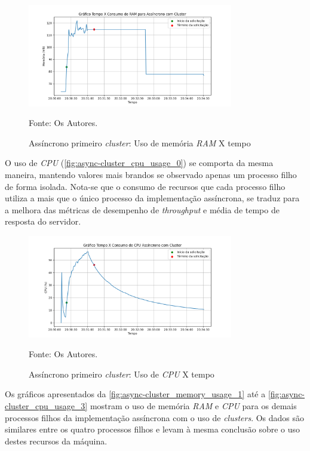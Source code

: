 \documentclass[12pt]{article}
\begin{document}
\begin{figure}[!h]
\centering
\caption{Assíncrono primeiro \textit{cluster}: Uso de memória \textit{RAM} X tempo}
\includegraphics[width=0.8\textwidth]{images/pt-br/results/async-cluster_memory_usage_0.png}
\label{fig:async-cluster_memory_usage_0}

Fonte: Os Autores.
\end{figure}

O uso de \textit{CPU} (\autoref{fig:async-cluster_cpu_usage_0}) se comporta da mesma
maneira, mantendo valores mais brandos se observado apenas um processo filho de forma isolada.
Nota-se que o consumo de recursos que cada processo filho utiliza a mais que o único processo
da implementação assíncrona, se traduz para a melhora das métricas de desempenho de 
\textit{throughput} e média de tempo de resposta do servidor.

\begin{figure}[!h]
\centering
\caption{Assíncrono primeiro \textit{cluster}: Uso de \textit{CPU} X tempo}
\includegraphics[width=0.8\textwidth]{images/pt-br/results/async-cluster_cpu_usage_0.png}
\label{fig:async-cluster_cpu_usage_0}

Fonte: Os Autores.
\end{figure}


Os gráficos apresentados da \autoref{fig:async-cluster_memory_usage_1} até a 
\autoref{fig:async-cluster_cpu_usage_3} mostram o uso de memória \textit{RAM}
e \textit{CPU} para os demais processos filhos da implementação assíncrona com o uso
de \textit{clusters}. Os dados são similares entre os quatro processos filhos e 
levam à mesma conclusão sobre o uso destes recursos da máquina.
\end{document}
